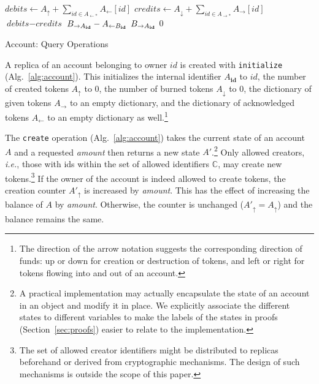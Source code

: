 \documentclass[9pt, oneside]{article}   	%
\begin{document}
\begin{algorithm}
\begin{algorithmic}[1]
    \State
        \State $\textit{debits} \leftarrow A_\uparrow + \sum\limits_{id \in A_{\leftarrow *}} A_{\leftarrow}[id]$ 
        \State $\textit{credits} \leftarrow A_\downarrow + \sum\limits_{id \in A_{\rightarrow *}} A_{\rightarrow}[id]$
        \State \Return $\textit{debits} - \textit{credits}$
    \EndFunction
    \State
        		\State \Return $B_{\rightarrow A_{\tiny\textbf{id}}} - A_{\leftarrow B_{\tiny\textbf{id}}}$
		\State \Return $B_{\rightarrow A_{\tiny\textbf{id}}}$
	\Else
		\State \Return $0$
	\EndIf
    \EndFunction
    \end{algorithmic}
\caption{\label{alg:query} Account: Query Operations}
\end{algorithm}

A replica of an account belonging to owner $id$ is created with \texttt{initialize} (Alg.~\ref{alg:account}). This initializes the internal identifier $A_{\textbf{id}}$ to $id$, the number of created tokens $A_\uparrow$ to $0$, the number of burned tokens $A_\downarrow$ to $0$, the dictionary of given tokens $A_\rightarrow$ to an empty dictionary, and the dictionary of acknowledged tokens $A_\leftarrow$ to an empty dictionary as well.\footnote{The direction of the arrow notation suggests the corresponding direction of funds: up or down for creation or destruction of tokens, and  left or right for tokens flowing into and out of an account.}

The \texttt{create} operation (Alg.~\ref{alg:account}) takes the current state of an account $A$ and a requested \textit{amount} then returns a new state $A'$.\footnote{A practical implementation may actually encapsulate the state of an account in an object and modify it in place. We explicitly associate the different states to different variables to make the labels of the states in proofs (Section~\ref{sec:proofs}) easier to relate to the implementation.} Only allowed creators, \textit{i.e.}, those with ids within the set of allowed identifiers $\mathds{C}$, may create new tokens.\footnote{The set of allowed creator identifiers might be distributed to replicas beforehand or derived from cryptographic mechanisms. The design of such mechanisms is outside the scope of this paper.} If the owner of the account is indeed allowed to create tokens, the creation counter $A'_\uparrow$ is increased by \textit{amount}. This has the effect of increasing the balance of $A$ by \textit{amount}. Otherwise, the counter is unchanged ($A'_\uparrow=A_\uparrow$) and the balance remains the same.
\end{document}
